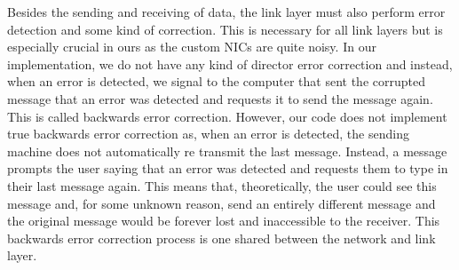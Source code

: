 \documentclass[10pt, letterpaper, twocolumn]{article}
\begin{document}
Besides the sending and receiving of data, the link layer must also perform error detection and some kind of correction. This is necessary for all link layers but is especially crucial in ours as the custom NICs are quite noisy. In our implementation, we do not have any kind of director error correction and instead, when an error is detected, we signal to the computer that sent the corrupted message that an error was detected and requests it to send the message again. This is called backwards error correction. However, our code does not implement true backwards error correction as, when an error is detected, the sending machine does not automatically re transmit the last message. Instead, a message prompts the user saying that an error was detected and requests them to type in their last message again. This means that, theoretically, the user could see this message and, for some unknown reason, send an entirely different message and the original message would be forever lost and inaccessible to the receiver. This backwards error correction process is one shared between the network and link layer. 
\end{document}
